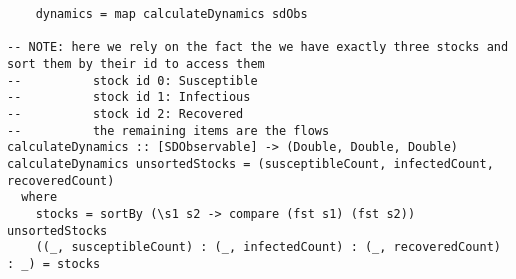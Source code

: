 \begin{verbatim}
    dynamics = map calculateDynamics sdObs
    
-- NOTE: here we rely on the fact the we have exactly three stocks and sort them by their id to access them
--          stock id 0: Susceptible
--          stock id 1: Infectious
--          stock id 2: Recovered
--          the remaining items are the flows
calculateDynamics :: [SDObservable] -> (Double, Double, Double)
calculateDynamics unsortedStocks = (susceptibleCount, infectedCount, recoveredCount) 
  where
    stocks = sortBy (\s1 s2 -> compare (fst s1) (fst s2)) unsortedStocks
    ((_, susceptibleCount) : (_, infectedCount) : (_, recoveredCount) : _) = stocks
\end{verbatim}